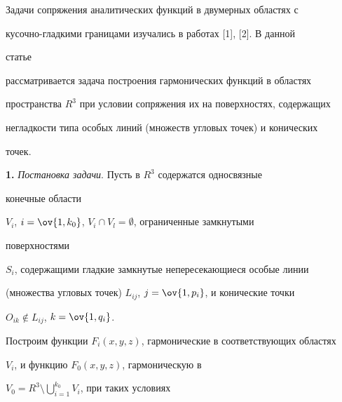 \date{} 




\pagestyle{plain} %


 




\maketitle 


\label{begin} 


 


 


Задачи сопряжения аналитических функций в двумерных областях с  


кусочно-гладкими границами изучались в работах [1], [2]. В данной 


статье  


рассматривается задача построения гармонических функций в областях  


пространства $R^3$ при условии сопряжения их на поверхностях, содержащих  


негладкости типа особых линий (множеств угловых точек) и конических 


точек. 


\medskip 


 


{\bf 1.} {\it Постановка задачи}. Пусть в $R^3$ содержатся односвязные 


конечные области 


$V_i$, $i=\ov{1,k_0}$, $V_i\cap V_l=\emptyset$, ограниченные замкнутыми 


поверхностями 


$S_i$, содержащими гладкие замкнутые непересекающиеся особые линии 


(множества угловых точек) $L_{i j}$, $j=\ov{1,p_i}$, и конические точки 


$O_{i k}\notin L_{i j}$, $k=\ov{1,q_i}$. 


 


Построим функции $F_i(x,y,z)$, гармонические в соответствующих областях 


$V_i$, и функцию $F_0(x,y,z)$, гармоническую в 


$V_0=R^3\setminus\bigcup\limits^{k_0}_{i=1}V_i$, при таких условиях 


